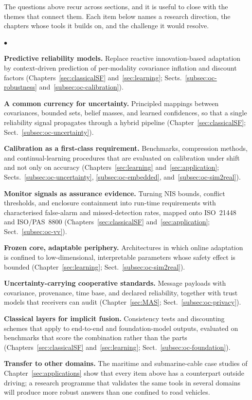 \documentclass[graybox,envcountchap]{style/SNmono}
\newenvironment{list4a}{
  \begin{list}{$\bullet$}{
      \setlength{\itemsep}{0.05cm}
      \setlength{\labelsep}{0.2cm}
      \setlength{\labelwidth}{0.3cm}
      \setlength{\parsep}{0in}
      \setlength{\parskip}{0in}
      \setlength{\topsep}{0in}
      \setlength{\partopsep}{0in}
      \setlength{\leftmargin}{0.16in}}}
      {\end{list}}
\begin{document}
The questions above recur across sections, and it is useful to close with the themes that connect them. Each item below names a research direction, the chapters whose tools it builds on, and the challenge it would resolve.
\begin{list4a}
    \item \textbf{Predictive reliability models.} Replace reactive innovation-based adaptation by context-driven prediction of per-modality covariance inflation and discount factors (Chapters~\ref{sec:classicalSF} and~\ref{sec:learning}; Sects.~\ref{subsec:oc-robustness} and~\ref{subsec:oc-calibration}).
    \item \textbf{A common currency for uncertainty.} Principled mappings between covariances, bounded sets, belief masses, and learned confidences, so that a single reliability signal propagates through a hybrid pipeline (Chapter~\ref{sec:classicalSF}; Sect.~\ref{subsec:oc-uncertainty}).
    \item \textbf{Calibration as a first-class requirement.} Benchmarks, compression methods, and continual-learning procedures that are evaluated on calibration under shift and not only on accuracy (Chapters~\ref{sec:learning} and~\ref{sec:application}; Sects.~\ref{subsec:oc-uncertainty}, \ref{subsec:oc-embedded}, and~\ref{subsec:oc-sim2real}).
    \item \textbf{Monitor signals as assurance evidence.} Turning NIS bounds, conflict thresholds, and enclosure containment into run-time requirements with characterised false-alarm and missed-detection rates, mapped onto ISO~21448 and ISO/PAS~8800 (Chapters~\ref{sec:classicalSF} and~\ref{sec:application}; Sect.~\ref{subsec:oc-vv}).
    \item \textbf{Frozen core, adaptable periphery.} Architectures in which online adaptation is confined to low-dimensional, interpretable parameters whose safety effect is bounded (Chapter~\ref{sec:learning}; Sect.~\ref{subsec:oc-sim2real}).
    \item \textbf{Uncertainty-carrying cooperative standards.} Message payloads with covariance, provenance, time base, and declared reliability, together with trust models that receivers can audit (Chapter~\ref{sec:MAS}; Sect.~\ref{subsec:oc-privacy}).
    \item \textbf{Classical layers for implicit fusion.} Consistency tests and discounting schemes that apply to end-to-end and foundation-model outputs, evaluated on benchmarks that score the combination rather than the parts (Chapters~\ref{sec:classicalSF} and~\ref{sec:learning}; Sect.~\ref{subsec:oc-foundation}).
    \item \textbf{Transfer to other domains.} The maritime and submarine-cable case studies of Chapter~\ref{sec:applications} show that every item above has a counterpart outside driving; a research programme that validates the same tools in several domains will produce more robust answers than one confined to road vehicles.
\end{list4a}
\end{document}
